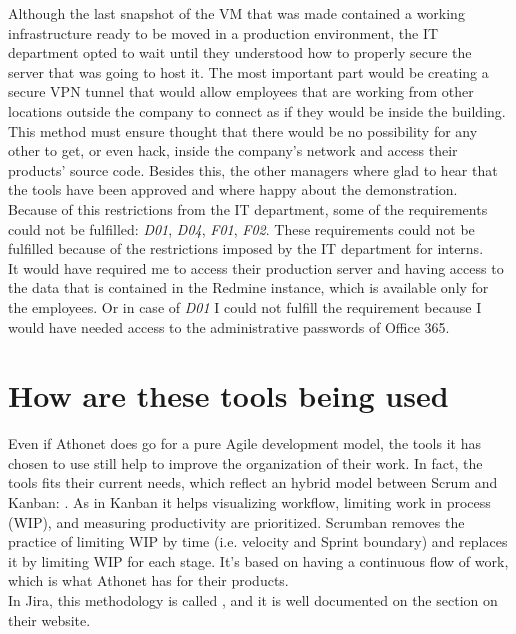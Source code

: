 	Although the last snapshot of the VM that was made contained a working infrastructure ready to be moved in a production environment, the IT department opted to wait until they understood how to properly secure the server that was going to host it.
	The most important part would be creating a secure \gls{VPN tunnel} that would allow employees that are working from other locations outside the company to connect as if they would be inside the building.
	This method must ensure thought that there would be no possibility for any other to get, or even hack, inside the company's network and access their products' source code.
	Besides this, the other managers where glad to hear that the tools have been approved and where happy about the demonstration.\\
	Because of this restrictions from the IT department, some of the requirements could not be fulfilled: \textit{D01}, \textit{D04}, \textit{F01}, \textit{F02}.
	These requirements could not be fulfilled because of the restrictions imposed by the IT department for interns.\\
	It would have required me to access their production server and having access to the data that is contained in the Redmine instance, which is available only for the employees.
	Or in case of \textit{D01} I could not fulfill the requirement because I would have needed access to the administrative passwords of Office 365.\\
	
\section{How are these tools being used}
	Even if Athonet does go for a pure Agile development model, the tools it has chosen to use still help to improve the organization of their work.
	In fact, the tools fits their current needs, which reflect an hybrid model between Scrum and Kanban: .
	As in Kanban it helps visualizing workflow, limiting work in process (WIP), and measuring productivity are prioritized.	
	Scrumban removes the practice of limiting WIP by time (i.e. velocity and Sprint boundary) and replaces it by limiting WIP for each stage.
	It's based on having a continuous flow of work, which is what Athonet has for their products.\\
	In Jira, this methodology is called \cite{kanplan}, and it is well documented on the  section on their website.